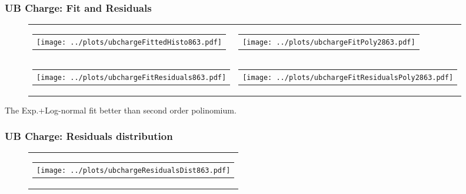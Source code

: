 \documentclass[aspectratio=169]{beamer}
\begin{document}
\begin{frame}
  \frametitle{UB Charge: Fit and Residuals}
  \begin{figure}
    \centering
    \begin{tabularx}{\textwidth}{CC}
      \begin{tabular}{l}
        \texttt{[image: ../plots/ubchargeFittedHisto863.pdf]}
      \end{tabular}
      &
      \begin{tabular}{l}
        \texttt{[image: ../plots/ubchargeFitPoly2863.pdf]}
      \end{tabular}
      \\
      \begin{tabular}{l}
        \texttt{[image: ../plots/ubchargeFitResiduals863.pdf]}
      \end{tabular}
      &
      \begin{tabular}{l}
        \texttt{[image: ../plots/ubchargeFitResidualsPoly2863.pdf]}
      \end{tabular}
    \end{tabularx}
  \end{figure}
  The Exp.+Log-normal fit better than second order polinomium.
\end{frame}


\begin{frame}
  \frametitle{UB Charge: Residuals distribution}
  \begin{figure}
    \centering
    \begin{tabularx}{\textwidth}{C}
      \begin{tabular}{l}
        \texttt{[image: ../plots/ubchargeResidualsDist863.pdf]}
      \end{tabular}
    \end{tabularx}
  \end{figure}
\end{frame}
\end{document}
